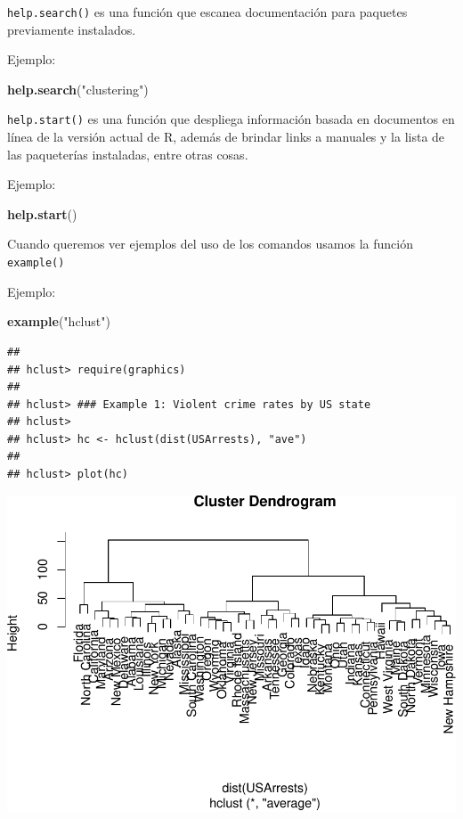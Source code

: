 \documentclass[
]{book}
\newenvironment{Shaded}{\begin{snugshade}}{\end{snugshade}}
\newcommand{\FunctionTok}[1]{\textcolor[rgb]{0.13,0.29,0.53}{\textbf{#1}}}
\newcommand{\NormalTok}[1]{#1}
\newcommand{\StringTok}[1]{\textcolor[rgb]{0.31,0.60,0.02}{#1}}
\begin{document}
\texttt{help.search()} es una función que escanea documentación para paquetes previamente instalados.

Ejemplo:

\begin{Shaded}
\begin{Highlighting}[]
\FunctionTok{help.search}\NormalTok{(}\StringTok{"clustering"}\NormalTok{)}
\end{Highlighting}
\end{Shaded}

\texttt{help.start()} es una función que despliega información basada en documentos en línea de la versión actual de R, además de brindar links a manuales y la lista de las paqueterías instaladas, entre otras cosas.

Ejemplo:

\begin{Shaded}
\begin{Highlighting}[]
\FunctionTok{help.start}\NormalTok{()}
\end{Highlighting}
\end{Shaded}

Cuando queremos ver ejemplos del uso de los comandos usamos la función \texttt{example()}

Ejemplo:

\begin{Shaded}
\begin{Highlighting}[]
\FunctionTok{example}\NormalTok{(}\StringTok{"hclust"}\NormalTok{)}
\end{Highlighting}
\end{Shaded}

\begin{verbatim}
## 
## hclust> require(graphics)
## 
## hclust> ### Example 1: Violent crime rates by US state
## hclust> 
## hclust> hc <- hclust(dist(USArrests), "ave")
## 
## hclust> plot(hc)
\end{verbatim}

\includegraphics{bookdown-demo_files/figure-latex/unnamed-chunk-11-1.pdf}
\end{document}
